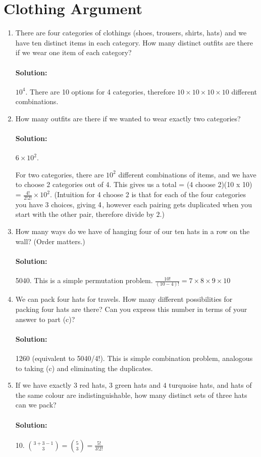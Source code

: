 \documentclass[11pt, notitlepage]{report}
\newcommand{\Question}[1]{\newpage\section{#1}}
\newenvironment{solution}{\paragraph{Solution:}}{\hfill}
\begin{document}
\Question{Clothing Argument}

  \begin{enumerate}[label=\alph*.)]

      \item There are four categories of clothings (shoes, trousers, shirts,
      hats) and we have ten distinct items in each category. How many distinct
      outfits are there if we wear one item of each category?
      \begin{solution}
      	$10^4$. There are 10 options for 4 categories, therefore $10\times 10 \times 10 \times 10$ different combinations.
      \end{solution}
      \item How many outfits are there if we wanted to wear exactly two categories?
	  \begin{solution}
	  	$6 \times 10^2$. 
	  	
	  	For two categories, there are $10^2$ different combinations of items, and we have to choose 2 categories out of 4. This gives us a total =
	  	(4 choose 2)(10 x 10) = $\frac{4!}{2!2!}\times 10^2$. (Intuition for 4 choose 2 is that for each of the four categories you have 3 choices, giving $4\time 3$, however each pairing gets duplicated when you start with the other pair, therefore divide by $2$.)
	  \end{solution}
      \item How many ways do we have of hanging four of our ten hats in a row on
      the wall? (Order matters.)
	  \begin{solution}
	  	5040. This is a simple permutation problem. $\frac{10!}{(10-4)!}=7\times8\times9\times10$
	  \end{solution}
      \item We can pack four hats for travels. How many different possibilities for packing 
      four hats are there? Can you express this number in terms of your answer
      to part (c)?
      \begin{solution}
      	1260 (equivalent to 5040/4!). This is simple combination problem, analogous to taking (c) and eliminating the duplicates.
      \end{solution}
      \item If we have exactly $3$ red hats, $3$ green hats and $4$ turquoise
      hats, and hats of the same colour are indistinguishable, how many distinct
      sets of three hats can we pack?
	  \begin{solution}
	  	10. ${3+3-1\choose 3} = {5\choose 3} = \frac{5!}{3!2!}$
	  \end{solution}
  \end{enumerate}
\end{document}
